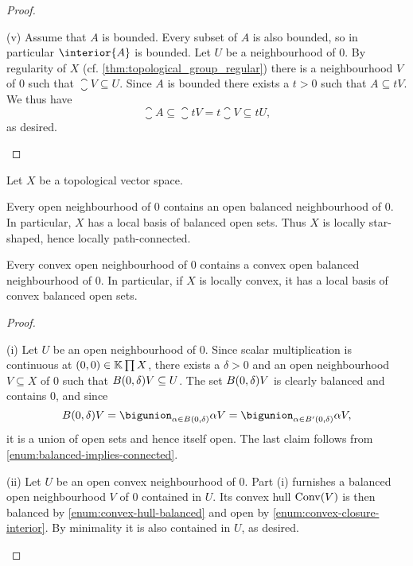 \documentclass[article, a4paper, 11pt, oneside]{memoir}
\numberwithin{equation}{chapter}
\begin{document}
\begin{proof}
\begin{proofsec}
    \item[(v)]
    Assume that $A$ is bounded. Every subset of $A$ is also bounded, so in particular $\interior{A}$ is bounded. Let $U$ be a neighbourhood of $0$. By regularity of $X$ (cf. \cref{thm:topological_group_regular}) there is a neighbourhood $V$ of $0$ such that $\closure{V} \subseteq U$. Since $A$ is bounded there exists a $t > 0$ such that $A \subseteq tV$. We thus have
    \begin{equation*}
        \closure{A}
            \subseteq \closure{tV}
            = t \closure{V}
            \subseteq tU,
    \end{equation*}
    as desired.
\end{proofsec}
\end{proof}


\begin{proposition}
    Let $X$ be a topological vector space.
    \begin{enumprop}
        \item \label{enum:balanced-local-basis} Every open neighbourhood of $0$ contains an open balanced neighbourhood of $0$. In particular, $X$ has a local basis of balanced open sets. Thus $X$ is locally star-shaped, hence locally path-connected.

        \item \label{enum:convex-balanced-local-basis} Every convex open neighbourhood of $0$ contains a convex open balanced neighbourhood of $0$. In particular, if $X$ is locally convex, it has a local basis of convex balanced open sets.
    \end{enumprop}
\end{proposition}

\begin{proof}
\begin{proofsec}
    \item[(i)]
    Let $U$ be an open neighbourhood of $0$. Since scalar multiplication is continuous at $(0,0) \in \mathbb{K} \prod X$, there exists a $\delta > 0$ and an open neighbourhood $V \subseteq X$ of $0$ such that $B_{}(0,\delta) V \subseteq U$. The set $B_{}(0,\delta) V$ is clearly balanced and contains $0$, and since
    \begin{equation*}
        \ball{0}{\delta} V
            = \bigunion_{\alpha \in \ball{0}{\delta}} \alpha V
            = \bigunion_{\alpha \in \pball{0}{\delta}} \alpha V,
    \end{equation*}
    it is a union of open sets and hence itself open. The last claim follows from \cref{enum:balanced-implies-connected}.

    \item[(ii)]
    Let $U$ be an open convex neighbourhood of $0$. Part (i) furnishes a balanced open neighbourhood $V$ of $0$ contained in $U$. Its convex hull $\operatorname{Conv}(V)$ is then balanced by \cref{enum:convex-hull-balanced} and open by \cref{enum:convex-closure-interior}. By minimality it is also contained in $U$, as desired.
\end{proofsec}
\end{proof}
\end{document}
